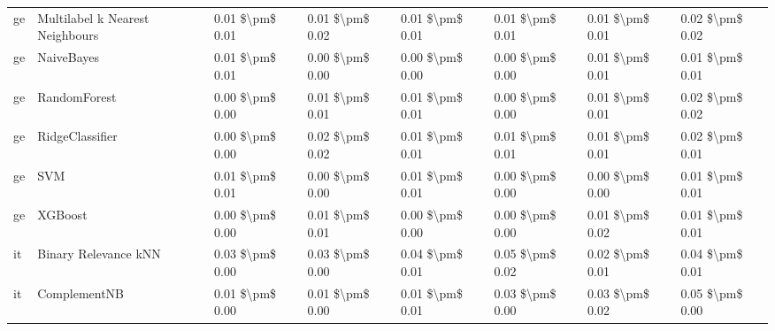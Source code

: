\begin{tabular}{llllllll}
      ge & Multilabel k Nearest Neighbours & 0.01 \$\textbackslash pm\$ 0.01 &           0.01 \$\textbackslash pm\$ 0.02 &       0.01 \$\textbackslash pm\$ 0.01 &        0.01 \$\textbackslash pm\$ 0.01 &                         0.01 \$\textbackslash pm\$ 0.01 &     0.02 \$\textbackslash pm\$ 0.02 \\
      ge &                      NaiveBayes & 0.01 \$\textbackslash pm\$ 0.01 &           0.00 \$\textbackslash pm\$ 0.00 &       0.00 \$\textbackslash pm\$ 0.00 &        0.00 \$\textbackslash pm\$ 0.00 &                         0.01 \$\textbackslash pm\$ 0.01 &     0.01 \$\textbackslash pm\$ 0.01 \\
      ge &                    RandomForest & 0.00 \$\textbackslash pm\$ 0.00 &           0.01 \$\textbackslash pm\$ 0.01 &       0.01 \$\textbackslash pm\$ 0.01 &        0.00 \$\textbackslash pm\$ 0.00 &                         0.01 \$\textbackslash pm\$ 0.01 &     0.02 \$\textbackslash pm\$ 0.02 \\
      ge &                 RidgeClassifier & 0.00 \$\textbackslash pm\$ 0.00 &           0.02 \$\textbackslash pm\$ 0.02 &       0.01 \$\textbackslash pm\$ 0.01 &        0.01 \$\textbackslash pm\$ 0.01 &                         0.01 \$\textbackslash pm\$ 0.01 &     0.02 \$\textbackslash pm\$ 0.01 \\
      ge &                             SVM & 0.01 \$\textbackslash pm\$ 0.01 &           0.00 \$\textbackslash pm\$ 0.00 &       0.01 \$\textbackslash pm\$ 0.01 &        0.00 \$\textbackslash pm\$ 0.00 &                         0.00 \$\textbackslash pm\$ 0.00 &     0.01 \$\textbackslash pm\$ 0.01 \\
      ge &                         XGBoost & 0.00 \$\textbackslash pm\$ 0.00 &           0.01 \$\textbackslash pm\$ 0.01 &       0.00 \$\textbackslash pm\$ 0.00 &        0.00 \$\textbackslash pm\$ 0.00 &                         0.01 \$\textbackslash pm\$ 0.02 &     0.01 \$\textbackslash pm\$ 0.01 \\
      it &            Binary Relevance kNN & 0.03 \$\textbackslash pm\$ 0.00 &           0.03 \$\textbackslash pm\$ 0.00 &       0.04 \$\textbackslash pm\$ 0.01 &        0.05 \$\textbackslash pm\$ 0.02 &                         0.02 \$\textbackslash pm\$ 0.01 &     0.04 \$\textbackslash pm\$ 0.01 \\
      it &                    ComplementNB & 0.01 \$\textbackslash pm\$ 0.00 &           0.01 \$\textbackslash pm\$ 0.00 &       0.01 \$\textbackslash pm\$ 0.01 &        0.03 \$\textbackslash pm\$ 0.00 &                         0.03 \$\textbackslash pm\$ 0.02 &     0.05 \$\textbackslash pm\$ 0.00 \\

\end{tabular}
